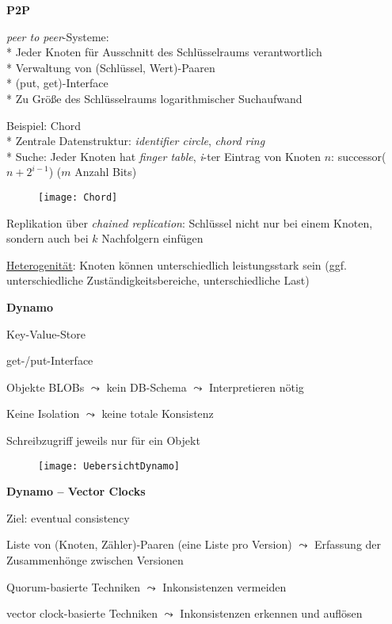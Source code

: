 \newpage

\textbf{P2P}
\begin{items}
	\item \emph{peer to peer}-Systeme:
		\\*
		Jeder Knoten für Ausschnitt des Schlüsselraums verantwortlich
		\\*
		Verwaltung von (Schlüssel, Wert)-Paaren
		\\*
		(put, get)-Interface
		\\*
		Zu Größe des Schlüsselraums logarithmischer Suchaufwand
	\item Beispiel: Chord
		\\*
		Zentrale Datenstruktur: \emph{identifier circle}, \emph{chord ring}
		\\* Suche: Jeder Knoten hat \emph{finger table}, \emph{i}-ter Eintrag von Knoten \( n \): successor(\( n+2^{i-1} \)) (\( m \) Anzahl Bits)
	\begin{figure}[H]\centering\label{Chord}\texttt{[image: Chord]}\end{figure}
	\item Replikation über \emph{chained replication}: Schlüssel nicht nur bei einem Knoten, sondern auch bei \( k \) Nachfolgern einfügen
	\item \underline{Heterogenität}: Knoten können unterschiedlich leistungsstark sein (ggf. unterschiedliche Zuständigkeitsbereiche, unterschiedliche Last)
\end{items}

\textbf{Dynamo}
\begin{items}
	\item Key-Value-Store
	\item get-/put-Interface
	\item Objekte BLOBs \( \leadsto \) kein DB-Schema \( \leadsto \) Interpretieren nötig
	\item Keine Isolation \( \leadsto \) keine totale Konsistenz
	\item Schreibzugriff jeweils nur für ein Objekt
\end{items}
\begin{figure}[H]\centering\label{UebersichtDynamo}\texttt{[image: UebersichtDynamo]}\end{figure}

\textbf{Dynamo -- Vector Clocks}
\begin{items}
	\item Ziel: eventual consistency
	\item Liste von (Knoten, Zähler)-Paaren (eine Liste pro Version) \( \leadsto \) Erfassung der Zusammenhönge zwischen Versionen
	\item Quorum-basierte Techniken \( \leadsto \) Inkonsistenzen vermeiden
	\item vector clock-basierte Techniken \( \leadsto \) Inkonsistenzen erkennen und auflösen
\end{items}